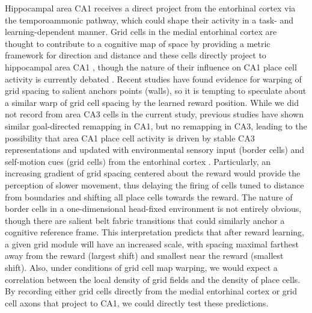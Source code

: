 Hippocampal area CA1 receives a direct project from the entorhinal cortex via the temporoammonic pathway, which could shape their activity in a task- and learning-dependent manner. Grid cells in the medial entorhinal cortex are thought to contribute to a cognitive map of space by providing a metric framework for direction and distance \citep{Hafting2005, Jeffery2015a} and these cells directly project to hippocampal area CA1 \citep{Zhang2013}, though the nature of their influence on CA1 place cell activity is currently debated \citep{Wills2010, Langston2010, Koenig2011, Brandon2011a}. Recent studies \citep{Krupic2015a, Stensola2015a} have found evidence for warping of grid spacing to salient anchors points (walls), so it is tempting to speculate about a similar warp of grid cell spacing by the learned reward position.
While we did not record from area CA3 cells in the current study, previous studies \citep{Dupret2010a} have shown similar goal-directed remapping in CA1, but no remapping in CA3, leading to the possibility that area CA1 place cell activity is driven by stable CA3 representations and updated with environmental sensory input (border cells) and self-motion cues (grid cells) from the entorhinal cortex \citep{Bush2014a}.
Particularly, an increasing gradient of grid spacing centered about the reward would provide the perception of slower movement, thus delaying the firing of cells tuned to distance from boundaries and shifting all place cells towards the reward. The nature of border cells in a one-dimensional head-fixed environment is not entirely obvious, though there are salient belt fabric transitions that could similarly anchor a cognitive reference frame.
This interpretation predicts that after reward learning, a given grid module will have an increased scale, with spacing maximal farthest away from the reward (largest shift) and smallest near the reward (smallest shift).
Also, under conditions of grid cell map warping, we would expect a correlation between the local density of grid fields and the density of place cells.
By recording either grid cells directly from the medial entorhinal cortex or grid cell axons that project to CA1, we could directly test these predictions.



